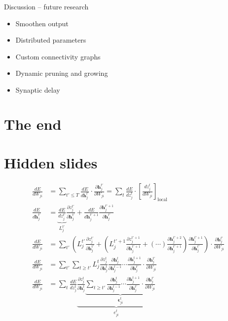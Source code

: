 \documentclass[t]{beamer}
\begin{document}
\begin{frame}{Discussion -- future research}
  \begin{itemize}[label=--]
    \item Smoothen output
    \item Distributed parameters
    \item Custom connectivity graphs
    \item Dynamic pruning and growing
    \item Synaptic delay
  \end{itemize}
\end{frame}

\section{The end}
\begin{frame}{}
\end{frame}

\section{Hidden slides}
\begin{frame}{}
  \footnotesize
  \begin{align}
  \frac{dE}{dW_{ji}} &= \sum_{t' \leq T}\frac{dE}{d\mathbf{h}_j^{t'}}\cdot\frac{\partial \mathbf{h}_j^{t'}}{\partial W_{ji}} =
  \sum_t\frac{dE}{dz_j^t}\cdot\left[\frac{dz_j^t}{dW_{ji}}\right]_\text{local}\\
  \frac{dE}{d\mathbf{h}_j^{t'}} &= \underbrace{\frac{dE}{dz_j^{t'}}}_{L^{t'}_j} \frac{\partial z_j^{t'}}{\partial\mathbf{h}_j^{t'}} + \frac{dE}{d\mathbf{h}_j^{t'+1}}\frac{\partial\mathbf{h}_j^{t'+1}}{\partial\mathbf{h}_j^{t'}}\\
  \frac{dE}{dW_{ji}} &= \sum_{t'}\left(L_j^{t'}\frac{\partial z_j^{t'}}{\partial\mathbf{h}_j^{t'}} + \left( L^{t'+1}_j \frac{\partial z_j^{t'+1}}{\partial\mathbf{h}_j^{t'+1}} + (\cdots)\frac{\partial\mathbf{h}_j^{t'+2}}{\partial\mathbf{h}_j^{t'+1}}  \right) \frac{\partial\mathbf{h}_j^{t'+1}}{\partial\mathbf{h}_j^{t'}}\right)\cdot\frac{\partial\mathbf{h}_j^{t'}}{\partial W_{ji}}\\
  \frac{dE}{dW_{ji}} &= \sum_{t'}\sum_{t\geq t'}L^t_j\frac{\partial z_j^t}{\partial\mathbf{h}_j^t}\frac{\partial\mathbf{h}^t_j}{\partial\mathbf{h}_j^{t-1}} \cdots \frac{\partial\mathbf{h}_j^{t+1}}{\partial\mathbf{h}_j^{t'}}\cdot\frac{\partial\mathbf{h}_j^{t'}}{\partial W_{ji}}\\
  \frac{dE}{dW_{ji}} &= \sum_t\frac{dE}{dz_j^t}\underbrace{\frac{\partial z_j^t}{\partial\mathbf{h}_j^t}\underbrace{\sum_{t\geq t'}\frac{\partial\mathbf{h}^t_j}{\partial\mathbf{h}_j^{t-1}} \cdots \frac{\partial\mathbf{h}_j^{t+1}}{\partial\mathbf{h}_j^{t'}}\cdot\frac{\partial\mathbf{h}_j^{t'}}{\partial W_{ji}}}_{\bm{\epsilon}_{ji}^t}}_{e^t_{ji}}
  \end{align}
\end{frame}
\end{document}
